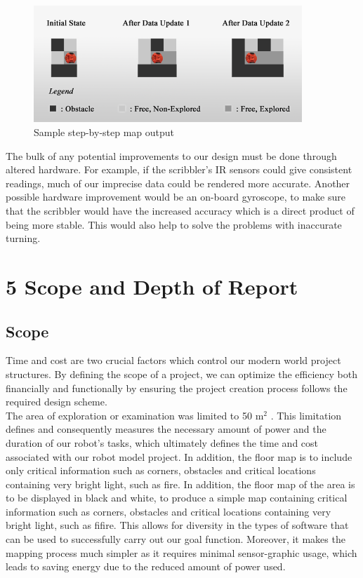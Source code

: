 \documentclass[12pt]{article}
\begin{document}
\begin{figure}[ht]
\centering
\includegraphics[width=0.9\textwidth]{realtimetracking.png}
\caption{Sample step-by-step map output}
\end{figure}

The bulk of any potential improvements to our design must be done through altered hardware. For example, if the scribbler's IR sensors could give consistent readings, much of our imprecise data could be rendered more accurate. Another possible hardware improvement would be an on-board gyroscope, to make sure that the scribbler would have the increased accuracy which is a direct product of being more stable. This would also help to solve the problems with inaccurate turning.\\

\newpage

\section*{\fontsize{16}{16}\textsf{5 Scope and Depth of Report}}
\onehalfspacing

\subsection*{\fontsize{14}{14}\textsf{Scope}}
\onehalfspacing
Time and cost are two crucial factors which control our modern world project structures. By defining the scope of a project, we can optimize the efficiency both financially and functionally by ensuring the project creation process follows the required design scheme.\\

The area of exploration or examination was limited to 50 m$^2$ . This limitation defines and consequently measures the necessary amount of power and the duration of our robot’s tasks, which ultimately defines the time and cost associated with our robot model project. In addition, the floor map is to include only critical information such as corners, obstacles and critical locations containing very bright light, such as fire. In addition, the ﬂoor map of the area is to be displayed in black and white, to produce a simple map containing critical information such as corners, obstacles and critical locations containing very bright light, such as ﬁfire. This allows for diversity in the types of software that can be used to successfully carry out our goal function. Moreover, it makes the mapping process much simpler as it requires minimal sensor-graphic usage, which leads to saving energy due to the reduced amount of power used. \\
\end{document}
